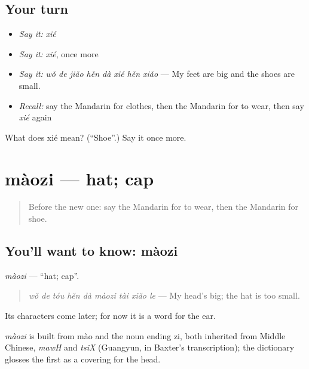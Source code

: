 \subsection*{Your turn}
\begin{itemize}
\raggedright
  \item \emph{Say it:} \emph{xié}
  \item \emph{Say it:} \emph{xié}, once more
  \item \emph{Say it:} \emph{wǒ de jiǎo hěn dà xié hěn xiǎo} — My feet are big and the shoes are small.
  \item \emph{Recall:} say the Mandarin for clothes, then the Mandarin for to wear, then say \emph{xié} again
\end{itemize}

\begin{tcolorbox}[breakable,colback=teal!4,colframe=teal!35!black,title={Before you move on}]
What does xié mean? (\textquotedblleft{}Shoe\textquotedblright{}.) Say it once more.
\end{tcolorbox}
\section[màozi]{màozi — hat; cap}

\label{lesson:ZH-C59-maozi}



\begin{quote}
Before the new one: say the Mandarin for to wear, then the Mandarin for shoe.
\end{quote}

\subsection*{You'll want to know: màozi}
\emph{màozi} — \textquotedblleft{}hat; cap\textquotedblright{}.

\begin{quote}
\emph{wǒ de tóu hěn dà màozi tài xiǎo le} — My head's big; the hat is too small.
\end{quote}

Its characters come later; for now it is a word for the ear.

\begin{cousinweb}
\emph{màozi} is built from mào and the noun ending zi, both inherited from Middle Chinese, \emph{mawH} and \emph{tsiX} (Guangyun, in Baxter's transcription); the dictionary glosses the first as a covering for the head.
\end{cousinweb}

